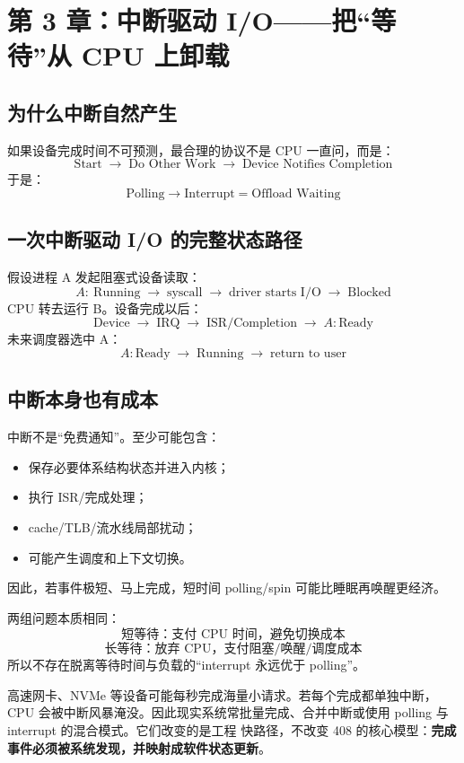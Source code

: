 \documentclass[11pt,a4paper]{ctexart}
\newcommand{\kw}[1]{\textbf{#1}}
\newcommand{\arr}{\;\longrightarrow\;}
\begin{document}
\section{第 3 章：中断驱动 I/O——把“等待”从 CPU 上卸载}

\subsection{为什么中断自然产生}
如果设备完成时间不可预测，最合理的协议不是 CPU 一直问，而是：
\[
\boxed{\text{Start}\arr\text{Do Other Work}\arr\text{Device Notifies Completion}}
\]
于是：
\[
\boxed{\text{Polling}\to\text{Interrupt}=\text{Offload Waiting}}
\]

\subsection{一次中断驱动 I/O 的完整状态路径}
假设进程 A 发起阻塞式设备读取：
\[
A:\ \text{Running}
\arr \text{syscall}
\arr \text{driver starts I/O}
\arr \text{Blocked}
\]
CPU 转去运行 B。设备完成以后：
\[
\text{Device}\arr\text{IRQ}\arr\text{ISR/Completion}\arr A:\text{Ready}
\]
未来调度器选中 A：
\[
A:\text{Ready}\arr\text{Running}\arr\text{return to user}
\]

\subsection{中断本身也有成本}
中断不是“免费通知”。至少可能包含：
\begin{itemize}
  \item 保存必要体系结构状态并进入内核；
  \item 执行 ISR/完成处理；
  \item cache/TLB/流水线局部扰动；
  \item 可能产生调度和上下文切换。
\end{itemize}
因此，若事件极短、马上完成，短时间 polling/spin 可能比睡眠再唤醒更经济。

\begin{bridge}[与并发专题同构：Polling vs Interrupt = Spin vs Sleep]
两组问题本质相同：
\[
\boxed{\text{短等待：支付 CPU 时间，避免切换成本}}
\]
\[
\boxed{\text{长等待：放弃 CPU，支付阻塞/唤醒/调度成本}}
\]
所以不存在脱离等待时间与负载的“interrupt 永远优于 polling”。
\end{bridge}

\begin{eng}
高速网卡、NVMe 等设备可能每秒完成海量小请求。若每个完成都单独中断，CPU 会被中断风暴淹没。因此现实系统常批量完成、合并中断或使用 polling 与 interrupt 的混合模式。它们改变的是工程 快路径，不改变 408 的核心模型：\kw{完成事件必须被系统发现，并映射成软件状态更新}。
\end{eng}
\end{document}
